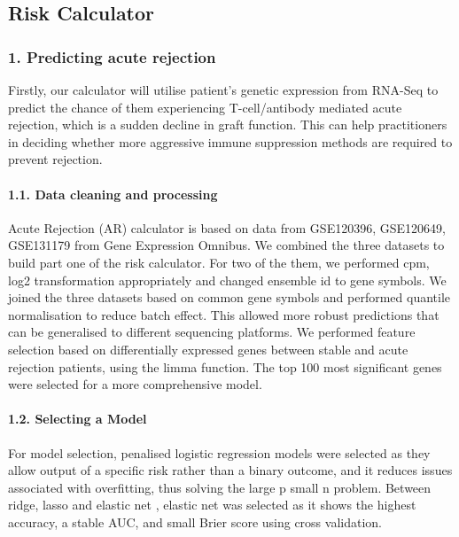 \documentclass[a4paper,9pt,twocolumn,twoside,]{pinp}
\begin{document}
\hypertarget{risk-calculator}{%
\subsection{Risk Calculator}\label{risk-calculator}}

\hypertarget{predicting-acute-rejection}{%
\subsubsection{1. Predicting acute
rejection}\label{predicting-acute-rejection}}

Firstly, our calculator will utilise patient's genetic expression from
RNA-Seq to predict the chance of them experiencing T-cell/antibody
mediated acute rejection, which is a sudden decline in graft function.
This can help practitioners in deciding whether more aggressive immune
suppression methods are required to prevent rejection.

\hypertarget{data-cleaning-and-processing}{%
\paragraph{1.1. Data cleaning and
processing}\label{data-cleaning-and-processing}}

Acute Rejection (AR) calculator is based on data from GSE120396,
GSE120649, GSE131179 from Gene Expression Omnibus. We combined the three
datasets to build part one of the risk calculator. For two of the them,
we performed cpm, log2 transformation appropriately and changed ensemble
id to gene symbols. We joined the three datasets based on common gene
symbols and performed quantile normalisation to reduce batch effect.
This allowed more robust predictions that can be generalised to
different sequencing platforms. We performed feature selection based on
differentially expressed genes between stable and acute rejection
patients, using the limma function. The top 100 most significant genes
were selected for a more comprehensive model.

\hypertarget{selecting-a-model}{%
\paragraph{1.2. Selecting a Model}\label{selecting-a-model}}

For model selection, penalised logistic regression models were selected
as they allow output of a specific risk rather than a binary outcome,
and it reduces issues associated with overfitting, thus solving the
large p small n problem. Between ridge, lasso and elastic net , elastic
net was selected as it shows the highest accuracy, a stable AUC, and
small Brier score using cross validation.
\end{document}
